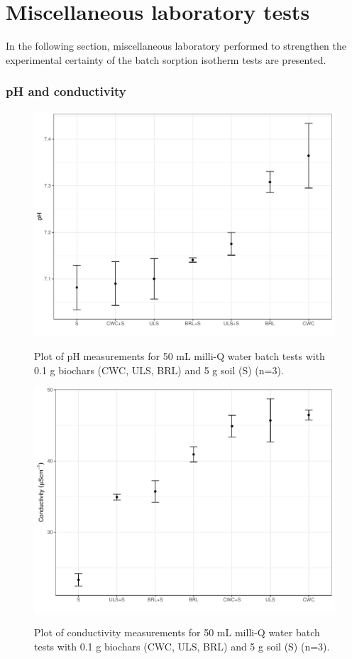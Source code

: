 \chapter{Miscellaneous laboratory tests}\label{appSec:misclab}

In the following section, miscellaneous laboratory performed to strengthen the experimental certainty of the batch sorption isotherm tests are presented. 

\subsection{pH and conductivity}

\begin{figure} 
\centering
\caption{Plot of pH measurements for 50 mL milli-Q water batch tests with 0.1 g biochars (CWC, ULS, BRL) and 5 g soil (S) (n=3).}
\includegraphics[width=\textwidth]{R/figs/pH.pdf}
\label{appfig:pH}
\end{figure}

\begin{figure} 
\centering
\caption{Plot of conductivity measurements for 50 mL milli-Q water batch tests with 0.1 g biochars (CWC, ULS, BRL) and 5 g soil (S) (n=3).}
\includegraphics[width=\textwidth]{R/figs/conductivity.pdf}
\label{appfig:cond}
\end{figure}

